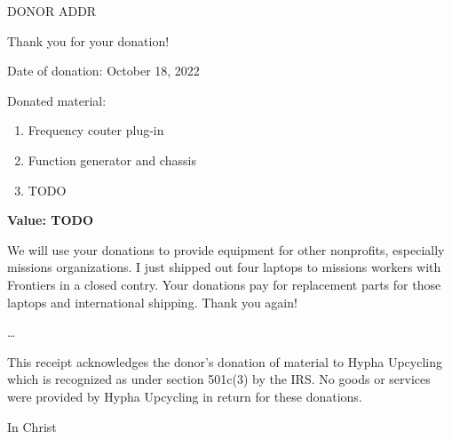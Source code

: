 \documentclass{letter}
\begin{document}
\begin{letter}{DONOR ADDR}

	\opening{Thank you for your donation!}	
	Date of donation: October 18, 2022
	
	Donated material:
	\begin{enumerate}
		\item Frequency couter plug-in
		\item Function generator and chassis
		\item TODO
	\end{enumerate}

	\textbf{Value: TODO}
	
	We will use your donations to provide equipment for other nonprofits, especially missions organizations.
	I just shipped out four laptops to missions workers with Frontiers in a closed contry.
	Your donations pay for replacement parts for those laptops and international shipping.
	Thank you again!
	
	\ldots
	
	This receipt acknowledges the donor’s donation of material to Hypha Upcycling
	which is recognized as under section 501c(3) by the IRS.
	No goods or services were provided by Hypha Upcycling in return for these donations.

\closing{In Christ}
\end{letter}
\end{document}
